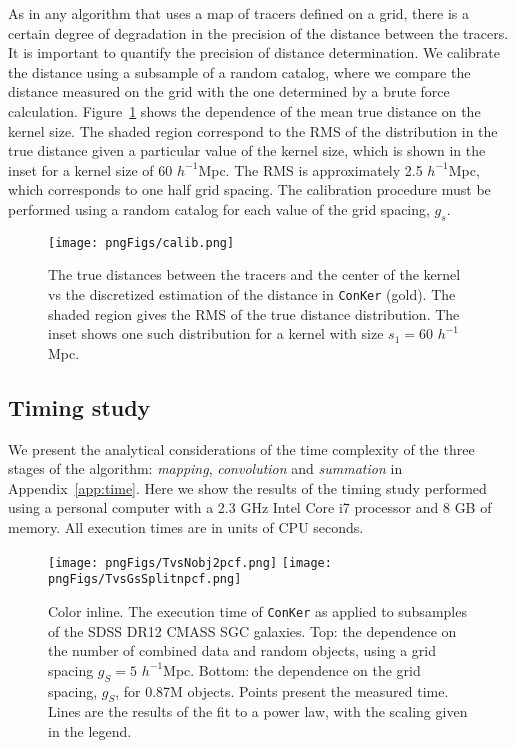\documentclass{aa}
\begin{document}
As in any algorithm that uses a map of tracers defined on a grid, there is a certain degree of degradation in the precision of the distance between the tracers. It is important to quantify the precision of distance determination. We calibrate the distance using a subsample of a random catalog, where we compare the distance measured on the grid with the one determined by a brute force calculation. Figure~\ref{fig:calib} shows the dependence of the mean true  distance on the kernel size. The shaded region correspond to the RMS of the distribution in the true distance given a particular value of the kernel size, which is shown in the inset for a kernel size of 60 $h^{-1}$Mpc. The RMS is approximately 2.5 $h^{-1}$Mpc, which corresponds to one half grid spacing. The calibration procedure must be performed using a random catalog for each value of the grid spacing, $g_s$. 

\begin{figure}
\texttt{[image: pngFigs/calib.png]}
\caption{The true distances between the tracers and the center of the kernel vs the discretized estimation of the distance in {\tt ConKer} (gold). The shaded region gives the RMS of the true distance distribution. The inset shows one such distribution for a kernel with size $s_1 = 60$ $h^{-1}$Mpc.}
\label{fig:calib}
\end{figure}

\subsection{Timing study}
\label{subsec:timing}

We present the analytical considerations of the time complexity of the three stages of the algorithm: \textit {mapping}, \textit {convolution} and \textit {summation} in Appendix~\ref{app:time}. Here we show the results of the timing study  performed using a personal computer with a 2.3 GHz Intel Core i7 processor and 8 GB of memory. All execution times are in units of CPU seconds. 

\begin{figure}
\texttt{[image: pngFigs/TvsNobj2pcf.png]}
\texttt{[image: pngFigs/TvsGsSplitnpcf.png]}
\caption{Color inline. The execution time of {\tt ConKer} as applied to subsamples of the SDSS DR12 CMASS SGC galaxies. Top: the dependence on the number of combined data and random objects, using a grid spacing $g_S = 5$ $h^{-1}$Mpc. Bottom: the dependence on the grid spacing, $g_S$, for 0.87M objects. Points present the measured time. Lines are the results of the fit to a power law, with the scaling given in the legend.
}
\label{fig:timingSplit}
\end{figure}
\end{document}
